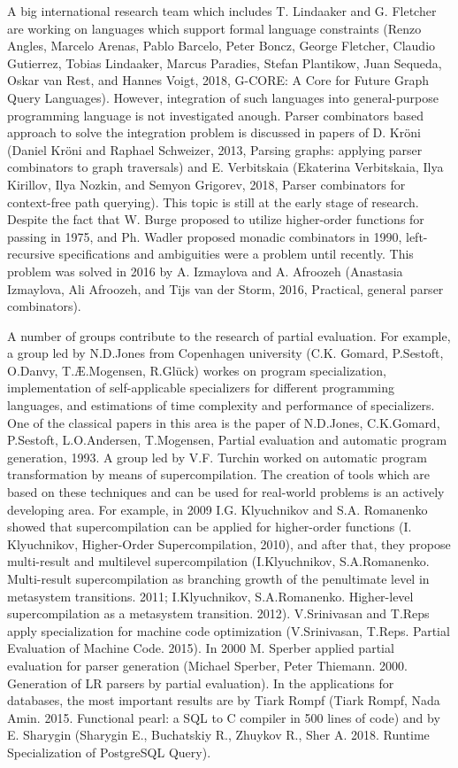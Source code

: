 \documentclass[12pt]{article}  %
\theoremstyle{remark}
\begin{document}
A big international research team which includes T. Lindaaker and G. Fletcher are working on languages which support formal language constraints (Renzo Angles, Marcelo Arenas, Pablo Barcelo, Peter Boncz, George Fletcher, Claudio Gutierrez, Tobias Lindaaker, Marcus Paradies, Stefan Plantikow, Juan Sequeda, Oskar van Rest, and Hannes Voigt, 2018, G-CORE: A Core for Future Graph Query Languages). However, integration of such languages into general-purpose programming language is not investigated anough. Parser combinators based approach to solve the integration problem is discussed in papers of D.  Kröni (Daniel Kröni and Raphael Schweizer, 2013, Parsing graphs: applying parser combinators to graph traversals) and  E. Verbitskaia (Ekaterina Verbitskaia, Ilya Kirillov, Ilya Nozkin, and Semyon Grigorev, 2018, Parser combinators for context-free path querying). This topic is still at the early stage of research. Despite the fact that W. Burge proposed to utilize higher-order functions for passing in 1975, and Ph. Wadler proposed monadic combinators in 1990, left-recursive specifications and ambiguities were a problem  until recently. This problem was solved in 2016 by A. Izmaylova and A. Afroozeh (Anastasia Izmaylova, Ali Afroozeh, and Tijs van der Storm, 2016, Practical, general parser combinators).

A number of groups contribute to the research of partial evaluation. For example, a group led by N.D.Jones from Copenhagen university (C.K. Gomard, P.Sestoft, O.Danvy, T.Æ.Mogensen, R.Glück) workes on program specialization, implementation of self-applicable specializers for different programming languages, and estimations of time complexity and performance of specializers. One of the classical papers in this area is the paper of N.D.Jones, C.K.Gomard, P.Sestoft, L.O.Andersen, T.Mogensen, Partial evaluation and automatic program generation, 1993. A group led by V.F. Turchin worked on automatic program transformation by means of supercompilation. The creation of tools which are based on these techniques and can be used for real-world problems is an actively developing area. For example, in 2009 I.G. Klyuchnikov and S.A. Romanenko showed that supercompilation can be applied for higher-order functions (I. Klyuchnikov, Higher-Order Supercompilation, 2010), and after that, they propose multi-result and multilevel supercompilation (I.Klyuchnikov, S.A.Romanenko. Multi-result supercompilation as branching growth of the penultimate level in metasystem transitions. 2011; I.Klyuchnikov, S.A.Romanenko. Higher-level supercompilation as a metasystem transition. 2012). V.Srinivasan and T.Reps apply specialization for machine code optimization (V.Srinivasan, T.Reps. Partial Evaluation of Machine Code. 2015). In 2000 M. Sperber applied partial evaluation for parser generation (Michael Sperber, Peter Thiemann. 2000. Generation of LR parsers by partial evaluation). In the applications for databases, the most important results are by Tiark Rompf (Tiark Rompf, Nada Amin. 2015. Functional pearl: a SQL to C compiler in 500 lines of code) and by E. Sharygin (Sharygin E., Buchatskiy R., Zhuykov R., Sher A. 2018. Runtime Specialization of PostgreSQL Query).
\end{document}
